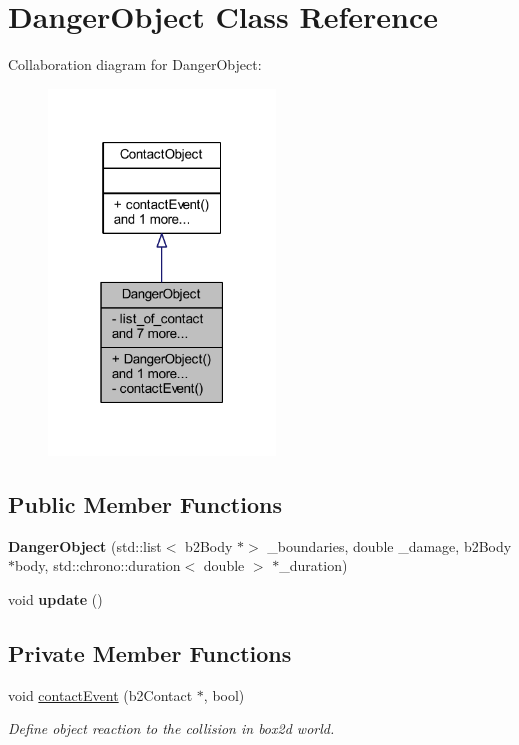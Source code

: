 \hypertarget{class_danger_object}{}\section{Danger\+Object Class Reference}
\label{class_danger_object}


Collaboration diagram for Danger\+Object\+:\nopagebreak
\begin{figure}[H]
\begin{center}
\leavevmode
\includegraphics[width=171pt]{class_danger_object__coll__graph}
\end{center}
\end{figure}
\subsection*{Public Member Functions}
\begin{DoxyCompactItemize}
\item 
\mbox{\label{class_danger_object_a87186516066d7d47dcea87eec44ee616}} 
{\bfseries Danger\+Object} (std\+::list$<$ b2\+Body $\ast$$>$ \+\_\+boundaries, double \+\_\+damage, b2\+Body $\ast$body, std\+::chrono\+::duration$<$ double $>$ $\ast$\+\_\+duration)
\item 
\mbox{\label{class_danger_object_a0c058336c21ee3e9b8fca876adda2dda}} 
void {\bfseries update} ()
\end{DoxyCompactItemize}
\subsection*{Private Member Functions}
\begin{DoxyCompactItemize}
\item 
void \hyperlink{class_danger_object_aebfc6b5b3dc2452cae78b157a29e8824}{contact\+Event} (b2\+Contact $\ast$, bool)
\begin{DoxyCompactList}\small\item\em Define object reaction to the collision in box2d world. \end{DoxyCompactList}\end{DoxyCompactItemize}
